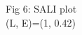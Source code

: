 \documentclass[preview]{standalone}
\begin{document}
\begin{center}
Fig 6: SALI plot\\ (L, E)=(1, 0.42)
\end{center}
\end{document}
